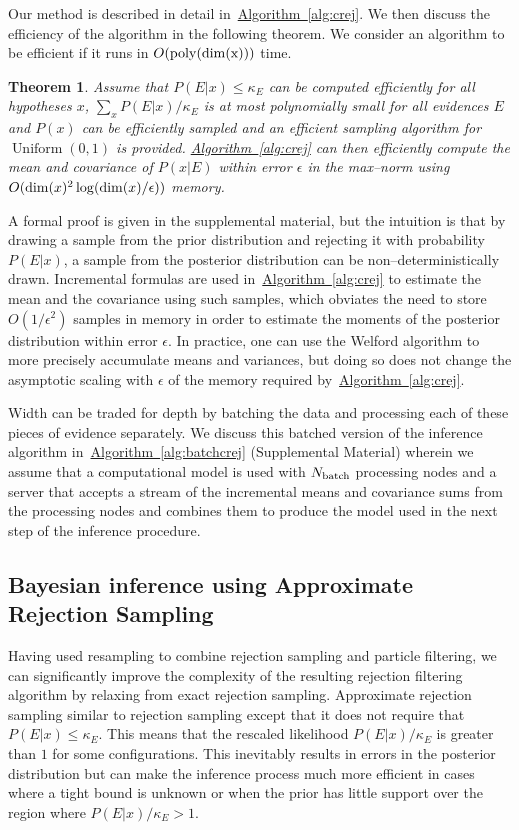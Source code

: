 \documentclass[twoside]{article}
\newtheorem{theorem}{Theorem}
\newcommand{\alg}[1]{\hyperref[alg:#1]{Algorithm~\ref*{alg:#1}}}
\begin{document}
Our method is described in detail in~\alg{crej}. We then discuss the efficiency of the algorithm in the following theorem.
We consider an algorithm to be efficient if it runs in $O(\rm{poly}({\rm dim}(x)))$ time.

\begin{theorem}
Assume that $P(E|x)\le \kappa_E$ can be computed efficiently for all hypotheses $x$, $\sum_x P(E|x)/\kappa_E$ is at most polynomially small for all
evidences $E$ and $P(x)$ can be efficiently sampled and an efficient sampling algorithm for $\operatorname{Uniform}(0,1)$ is provided.  \alg{crej} 
can then efficiently compute the mean and covariance of $P(x|E)$ within error $\epsilon$ in the max--norm using $O({\rm dim}(x)^2\log({\rm dim}(x)/\epsilon))$ memory.\label{thm:crej}
\end{theorem}
A formal proof is given in the supplemental material, but the intuition is that by drawing a
sample from the prior distribution and rejecting it with probability $P(E|x)$, a sample from
the posterior distribution can be non--deterministically drawn.  Incremental formulas are
used in~\alg{crej} to estimate the mean and the covariance using such samples, which obviates the need
to store $O(1/\epsilon^2)$ samples in memory in order to estimate the moments of the posterior distribution within error $\epsilon$.
In practice, one can use the Welford algorithm \cite{welford_note_1962} to more precisely accumulate means
and variances, but doing so does not change the asymptotic scaling with $\epsilon$ of the memory required by~\alg{crej}.

Width can be traded for depth by batching the data and processing each of
these pieces of evidence separately. We discuss this batched version of the
inference algorithm in~\alg{batchcrej} (Supplemental Material) wherein we
assume that a computational model is used with $N_{\rm batch}$ processing
nodes and a server that accepts a stream of the incremental means and
covariance sums from the processing nodes and combines them to produce the
model used in the next step of the inference procedure.

\subsection{Bayesian inference using Approximate Rejection Sampling}

Having used resampling to combine rejection sampling and particle filtering,
we can significantly improve the complexity of the resulting rejection filtering
algorithm by relaxing from exact rejection sampling.  Approximate rejection
sampling similar to rejection sampling except
that it does not require that $P(E|x) \le \kappa_E$.  This means that the rescaled
likelihood $P(E|x)/\kappa_E$ is greater than $1$ for some
configurations.  This inevitably results in errors in the posterior distribution but can make the inference process much more efficient
in cases where a tight bound is unknown or when the prior has little support over the region where $P(E|x)/\kappa_E >1$.
\end{document}
